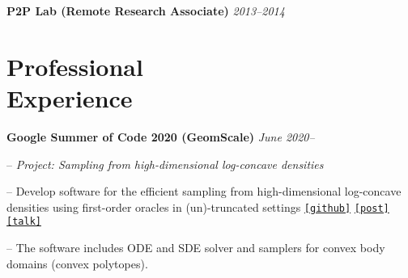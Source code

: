 \documentclass[margin, 10pt]{res}
\newcommand{\field}[2]{\noindent \textbf{#1} \hfill #2 \\}
\begin{document}
\begin{resume}
\textbf{P2P Lab (Remote Research Associate)} \hfill \emph{2013--2014}


 
\section{Professional \\ Experience}
\field{Google Summer of Code 2020 (GeomScale)}  {\emph{June 2020--}}
\begin{compactitem}
\item[--] \emph{Project: Sampling from high-dimensional log-concave densities} 
\item[--] Develop software for the efficient sampling from high-dimensional log-concave densities using first-order oracles in (un)-truncated settings \href{https://GeomScale/volume_approximation}{\nolinkurl{[github]}} \href{https://papachristoumarios.github.io/2020/07/21/Sampling-from-high-dimensional-truncated-log-concave-densities-with-volesti/}{\nolinkurl{[post]}} \href{https://www.youtube.com/watch?v=P7YfC8Nn6sY}{\nolinkurl{[talk]}}
\item[--] The software includes ODE and SDE solver and samplers for convex body domains (convex polytopes).
\end{compactitem}


\end{resume}
\end{document}
